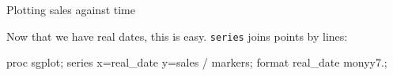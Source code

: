 \documentclass[unknownkeysallowed]{beamer}\usepackage[]{graphicx}\usepackage[]{color}
\begin{document}
\begin{frame}[fragile]{Plotting sales against time}
  
  Now that we have real dates, this is easy. \texttt{series} joins
  points by lines:
  
  \begin{Sascode}[store=komav]
proc sgplot;
  series x=real_date y=sales / markers;
  format real_date monyy7.;
  \end{Sascode}
  
  
\end{frame}

\end{document}
